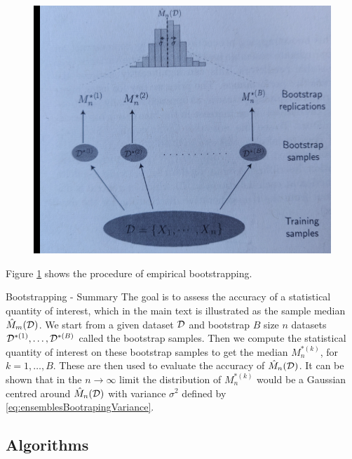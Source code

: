 \begin{figure}[h!]
	\centering
	\includegraphics[width=0.7\linewidth]{gfx/Bootstrapping}
	\caption{}
	\label{fig:bootstrapping}
\end{figure}
Figure \ref{fig:bootstrapping} shows the procedure of empirical bootstrapping. 
\begin{mybox}{Bootstrapping - Summary}
	The goal is to assess the accuracy of a statistical quantity of interest, which in the main text is illustrated as the sample median $\hat{M}_m(\mathcal{D})$. We start from a given dataset $\mathcal{D}$ and bootstrap $B$ size $n$ datasets $\mathcal{D}^{*(1)},\dots,\mathcal{D}^{*(B)}$ called the bootstrap samples. Then we compute the statistical quantity of interest on these bootstrap samples to get the median $M^{*(k)}_n$, for $k=1,\dots,B$. These are then used to evaluate the accuracy of $\hat{M}_n(\mathcal{D})$. It can be shown that in the $n\rightarrow\infty$ limit the distribution of $M^{*(k)}_n$ would be a Gaussian centred around $\hat{M}_n(\mathcal{D})$ with variance $\sigma^2$ defined by \ref{eq:ensemblesBootrapingVariance}.
\end{mybox}


\subsection{Algorithms}
